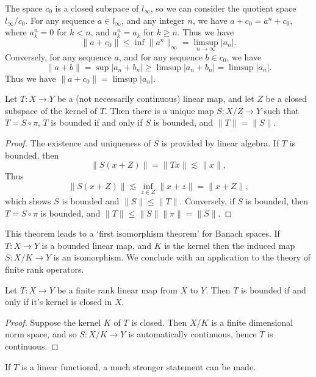 \begin{example}
    The space $c_0$ is a closed subspace of $l_\infty$, so we can consider the quotient space $l_\infty / c_0$. For any sequence $a \in l_\infty$, and any integer $n$, we have $a + c_0 = a^n + c_0$, where $a^n_k = 0$ for $k < n$, and $a^n_k = a_k$ for $k \geq n$. Thus we have
    \[ \| a + c_0 \| \leq \inf \| a^n \|_\infty = \limsup_{n \to \infty} |a_n|. \]
    Conversely, for any sequence $a$, and for any sequence $b \in c_0$, we have
    \[ \| a + b \| = \sup |a_n + b_n| \geq \limsup |a_n + b_n| = \limsup |a_n|. \]
    Thus we have $\| a + c_0 \| = \limsup |a_n|$.
\end{example}

\begin{theorem}
    Let $T: X \to Y$ be a (not necessarily continuous) linear map, and let $Z$ be a closed subspace of the kernel of $T$. Then there is a unique map $S: X/Z \to Y$ such that $T = S \circ \pi$, $T$ is bounded if and only if $S$ is bounded, and $\| T \| = \| S \|$.
\end{theorem}
\begin{proof}
    The existence and uniqueness of $S$ is provided by linear algebra. If $T$ is bounded, then
    \[ \| S(x + Z) \| = \| Tx \| \lesssim \| x \|, \]
    Thus
    \[ \| S(x + Z) \| \lesssim \inf_{z \in Z} \| x + z \| = \| x + Z \|, \]
    which shows $S$ is bounded and $\| S \| \leq \| T \|$. Conversely, if $S$ is bounded, then $T = S \circ \pi$ is bounded, and $\| T \| \leq \| S \| \| \pi \| = \| S \|$.
\end{proof}

This theorem leads to a `first isomorphism theorem' for Banach spaces. If $T: X \to Y$ is a bounded linear map, and $K$ is the kernel then the induced map $S: X/K \to Y$ is an isomorphism. We conclude with an application to the theory of finite rank operators.

\begin{theorem}
    Let $T: X \to Y$ be a finite rank linear map from $X$ to $Y$. Then $T$ is bounded if and only if it's kernel is closed in $X$.
\end{theorem}
\begin{proof}
    Suppose the kernel $K$ of $T$ is closed. Then $X/K$ is a finite dimensional norm space, and so $S: X/K \to Y$ is automatically continuous, hence $T$ is continuous.
\end{proof}

If $T$ is a linear functional, a much stronger statement can be made.

